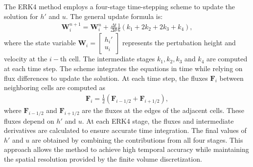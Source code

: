 The ERK4 method employs a four-stage time-stepping scheme to update the solution for $h'$ and $u$.
The general update formula is:
\begin{align*}
    \mathbf{W}_i^{n+1} = \mathbf{W}_i^n + \frac{\Delta t}{\Delta \theta} \frac{1}{6} \left(k_1 + 2 k_2 + 2 k_3 + k_4 \right),
\end{align*}
where the state variable
$\mathbf{W}_i = \begin{bmatrix}
    h_i' \\
    u_i
\end{bmatrix}$ represents the pertubation height and velocity at the $i-$th cell.
The intermediate stages $k_1, k_2, k_3$ and $k_4$ are computed at each time step.
The scheme integrates the equations in time while relying on flux differences to update the solution.
At each time step, the fluxes $\mathbf{F}_i$ between neighboring cells are computed as
\begin{align*}
    \mathbf{F}_i = \frac{1}{2}(\mathbf{F}_{i-1/2} + \mathbf{F}_{i+1/2}),
\end{align*}
where $\mathbf{F}_{i-1/2}$ and $\mathbf{F}_{i+1/2}$ are the fluxes at the edges of the adjacent cells.
These fluxes depend on $h'$ and $u$.
At each ERK4 stage, the fluxes and intermediate derivatives are calculated to ensure accurate time integration.
The final values of $h'$ and $u$ are obtained by combining the contributions from all four stages.
This approach allows the method to achieve high temporal accuracy while maintaining the spatial resolution provided by the finite volume discretization.


